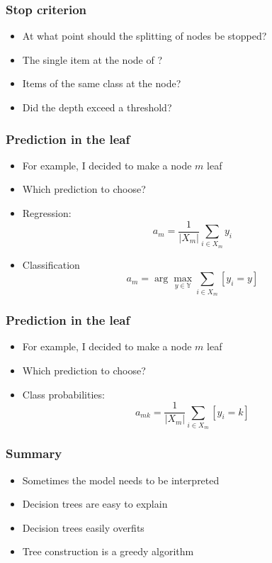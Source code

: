 \documentclass[default]{beamer}
\begin{document}
	\begin{frame}
		\frametitle{Stop criterion}
		\Large
		\begin{itemize}
			\item At what point should the splitting of nodes be stopped?
			\item The single item at the node of ?
			\item Items of the same class at the node?
			\item Did the depth exceed a threshold?
		\end{itemize}
		
	\end{frame}

	\begin{frame}
		\frametitle{Prediction in the leaf}
		\Large
		\begin{itemize}
			\item For example, I decided to make a node $m$ leaf
			\item Which prediction to choose?
			\item Regression:
			\[
				a_m=\frac{1}{|X_m|}\sum_{i\in X_m}y_i
			\]
			\item Classification
			\[
				a_m=\arg\max_{y\in\mathbb Y}\sum_{i\in X_m}[y_i=y]
			\]
		\end{itemize}
		
	\end{frame}

	\begin{frame}
		\frametitle{Prediction in the leaf}
		\Large
		\begin{itemize}
			\item For example, I decided to make a node $m$ leaf
			\item Which prediction to choose?
			\item Class probabilities:
			\[
			a_{mk}=\frac{1}{|X_m|}\sum_{i\in X_m}[y_i=k]
			\]
		\end{itemize}
		
	\end{frame}

	\begin{frame}
		\frametitle{Summary}
		\Large
		\begin{itemize}
			\item Sometimes the model needs to be interpreted
			\item Decision trees are easy to explain
			\item Decision trees easily overfits
			\item Tree construction is a greedy algorithm
		\end{itemize}
		
	\end{frame}
\end{document}
